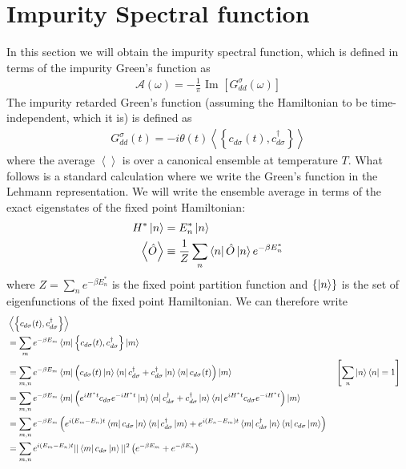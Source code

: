\documentclass[twoside]{report}
\numberwithin{equation}{section}
\begin{document}
\section{Impurity Spectral function}
In this section we will obtain the impurity spectral function, which is defined in terms of the impurity Green's function as
\begin{equation}\begin{aligned}
	\mathcal{A(\omega)} = -\frac{1}{\pi}\text{ Im }\left[G_{dd}^\sigma\left( \omega \right) \right] 
\end{aligned}\end{equation}
The impurity retarded Green's function (assuming the Hamiltonian to be time-independent, which it is) is defined as
\begin{equation}\begin{aligned}
	G_{dd}^\sigma(t) = -i\theta(t) \left<\left\{ c_{d\sigma}(t),c^\dagger_{d\sigma} \right\}  \right>
\end{aligned}\end{equation}
where the average \(\left< \right>\) is over a canonical ensemble at temperature \(T\). What follows is a standard calculation where we write the Green's function in the Lehmann representation. We will write the ensemble average in terms of the exact eigenstates of the fixed point Hamiltonian:
\begin{equation}\begin{aligned}
	H^* \ket{n} &= E_n^* \ket{n}\\
	\left<\hat O \right> &\equiv \frac{1}{Z}\sum_n \bra{n} \hat O \ket{n} e^{-\beta E_n^*}
\end{aligned}\end{equation}
where \(Z = \sum_n e^{-\beta E_n^*}\) is the fixed point partition function and \(\left\{ \ket{n} \right\} \) is the set of eigenfunctions of the fixed point Hamiltonian. We can therefore write
\begin{equation}\begin{aligned}
	&\left<\left\{ c_{d\sigma}(t),c^\dagger_{d\sigma} \right\}  \right> \\
	&= \sum_{m}e^{-\beta E_m}\bra{m}\left\{ c_{d\sigma}(t),c^\dagger_{d\sigma} \right\} \ket{m}\\
	&= \sum_{m,n}e^{-\beta E_m}\bra{m}\left( c_{d\sigma}(t)\ket{n}\bra{n}c^\dagger_{d\sigma} + c^\dagger_{d\sigma}\ket{n}\bra{n}c_{d\sigma}(t)\right) \ket{m} && \left[\sum_n \ket{n}\bra{n} = 1\right]  \\
	&= \sum_{m,n}e^{-\beta E_m}\bra{m}\left( e^{iH^* t}c_{d\sigma}e^{-iH^* t}\ket{n}\bra{n}c^\dagger_{d\sigma} + c^\dagger_{d\sigma}\ket{n}\bra{n}e^{iH^* t}c_{d\sigma}e^{-iH^* t}\right) \ket{m}\\
	&= \sum_{m,n}e^{-\beta E_m}\left( e^{i\left( E_m - E_n \right)  t}\bra{m}c_{d\sigma}\ket{n}\bra{n}c^\dagger_{d\sigma} \ket{m} + e^{i\left( E_n - E_m \right)  t}\bra{m}c^\dagger_{d\sigma}\ket{n}\bra{n}c_{d\sigma} \ket{m}\right)\\
	&= \sum_{m,n}e^{i\left( E_m - E_n \right)  t}||\bra{m}c_{d\sigma}\ket{n}||^2\left( e^{-\beta E_m} + e^{-\beta E_n}\right)\\
\end{aligned}\end{equation}
\end{document}
